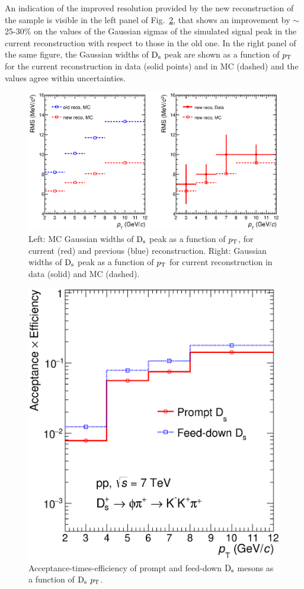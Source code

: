 An indication of the improved resolution provided by the new 
reconstruction of the sample is visible in the left panel of Fig.~\ref{fig:sigma4vs2}, 
that shows an improvement by $\sim$25-30\% on the values of the Gaussian sigmas 
of the simulated signal peak in the current reconstruction with respect to those in the old one.
In the right panel of the same figure, the Gaussian widths of ${\rm D_s}$ peak are shown 
as a function of $p_{\rm T}$ for the current reconstruction in data (solid points)
and in MC (dashed) and the values agree within uncertainties. 
\begin{figure}[!hb]
\begin{center}
\includegraphics[width=.9\textwidth]{FigCap4/Resolutions_pass2_pass4.eps}
\caption{Left: MC Gaussian widths of ${\rm D_s}$ peak as a function of $p_{\rm T}$, for current (red) and previous (blue) reconstruction. Right: Gaussian widths of ${\rm D_s}$ peak as a function of $p_{\rm T}$ for current reconstruction in data (solid) and MC (dashed). }
\label{fig:sigma4vs2}
\end{center}
\end{figure}

\begin{figure}[!hb]
\begin{center}
\includegraphics[width=.52\textwidth]{FigCap4/AccEff_Ds_Pass4.eps}
\caption{Acceptance-times-efficiency of prompt and feed-down ${\rm D_s}$ mesons as a function of ${\rm D_s}$ $p_{\rm T}$.}
\label{fig:sigma4vs2}
\end{center}
\end{figure}

